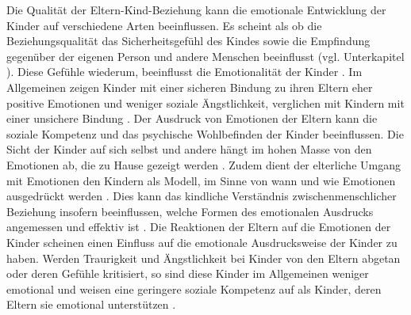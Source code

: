 Die Qualität der Eltern-Kind-Beziehung kann die emotionale Entwicklung der Kinder auf verschiedene Arten beeinflussen. Es scheint als ob die Beziehungsqualität das Sicherheitsgefühl des Kindes sowie die Empfindung gegenüber der eigenen Person und andere Menschen beeinflusst (vgl. Unterkapitel ). Diese Gefühle wiederum, beeinflusst die Emotionalität der Kinder \cite[S.~561]{Siegler2008}. Im Allgemeinen zeigen Kinder mit einer sicheren Bindung zu ihren Eltern eher positive Emotionen und weniger soziale Ängstlichkeit, verglichen mit Kindern mit einer unsichere Bindung \cite{Bohlin2000}. Der Ausdruck von Emotionen der Eltern kann die soziale Kompetenz und das psychische Wohlbefinden der Kinder beeinflussen. Die Sicht der Kinder auf sich selbst und andere hängt im hohen Masse von den Emotionen ab, die zu Hause gezeigt werden \cite{Dunsmore1997}. Zudem dient der elterliche Umgang mit Emotionen den Kindern als Modell, im Sinne von wann und wie Emotionen ausgedrückt werden \cite{Denham1994}. Dies kann das kindliche Verständnis zwischenmenschlicher Beziehung insofern beeinflussen, welche Formen des emotionalen Ausdrucks angemessen und effektiv ist \cite{Halberstadt1995}. Die Reaktionen der Eltern auf die Emotionen der Kinder scheinen einen Einfluss auf die emotionale Ausdrucksweise der Kinder zu haben. Werden Traurigkeit und Ängstlichkeit bei Kinder von den Eltern abgetan oder deren Gefühle kritisiert, so sind diese Kinder im Allgemeinen weniger emotional und weisen eine geringere soziale Kompetenz auf als Kinder, deren Eltern sie emotional unterstützen \cite{Eisenberg1998, McDowell2000}. 

